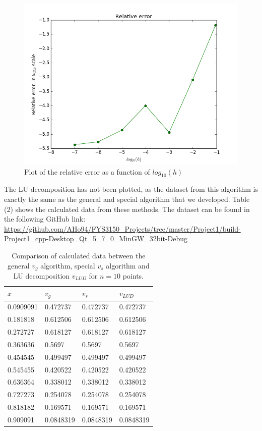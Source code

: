 \documentclass[12pt]{article}
\begin{document}
\begin{figure}[hbtp]
\centering
\includegraphics[scale=0.5]{Data_plots/Relative_error.png}
\caption{Plot of the relative error as a function of $log_{10}(h)$}
\end{figure}

The LU decomposition has not been plotted, as the dataset from this algorithm is exactly the same as the general and special algorithm that we developed. Table (2) shows the calculated data from these methods. The dataset can be found in the following GitHub link: \url{https://github.com/AHo94/FYS3150_Projects/tree/master/Project1/build-Project1_cpp-Desktop_Qt_5_7_0_MinGW_32bit-Debug} 

\begin{table}
\begin{center}
	\begin{tabular}{| l | l | l | l |}
		$x$ & $v_g$ & $v_s$ & $v_{LUD}$ \\ \hline
		0.0909091 & 0.472737 & 0.472737 & 0.472737 \\
		0.181818  & 0.612506 & 0.612506 & 0.612506 \\
		0.272727 &  0.618127 & 0.618127& 0.618127\\
		0.363636 &  0.5697 & 0.5697& 0.5697\\
		0.454545 &  0.499497 & 0.499497& 0.499497\\
		0.545455 &  0.420522 & 0.420522& 0.420522\\
		0.636364 &  0.338012 & 0.338012& 0.338012\\
		0.727273 &  0.254078 & 0.254078& 0.254078\\
		0.818182 &  0.169571 & 0.169571& 0.169571\\
		0.909091 &  0.0848319 & 0.0848319& 0.0848319 \\ \hline
	\end{tabular}
\caption{Comparison of calculated data between the general $v_g$ algorithm, special $v_s$ algorithm and LU decomposition $v_{LUD}$ for $n=10$ points.}
\end{center}
\end{table}
\end{document}
